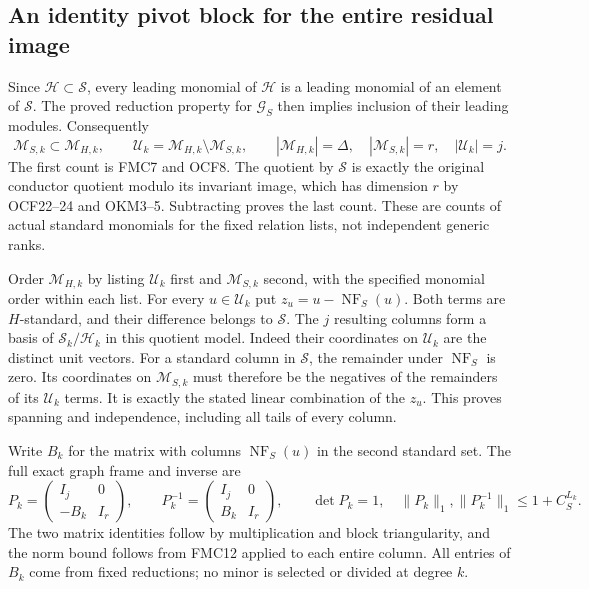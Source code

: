 \documentclass[11pt,a4paper]{article}
\begin{document}
\subsection{An identity pivot block for the entire residual image}

Since $\mathscr H\subset\mathscr S$, every leading monomial of
$\mathscr H$ is a leading monomial of an element of $\mathscr S$.
The proved reduction property for $\mathcal G_S$ then implies
inclusion of their leading modules. Consequently
\[
 \mathscr M_{S,k}\subset\mathscr M_{H,k},\qquad
 \mathscr U_k=\mathscr M_{H,k}\setminus\mathscr M_{S,k},\qquad
 |\mathscr M_{H,k}|=\Delta,\quad
 |\mathscr M_{S,k}|=r,\quad |\mathscr U_k|=j.
 \tag{FMC19}
\]
The first count is FMC7 and OCF8. The quotient by $\mathscr S$
is exactly the original conductor quotient modulo its invariant
image, which has dimension $r$ by OCF22--24 and OKM3--5.
Subtracting proves the last count. These are counts of actual
standard monomials for the fixed relation lists, not independent
generic ranks.

Order $\mathscr M_{H,k}$ by listing $\mathscr U_k$ first and
$\mathscr M_{S,k}$ second, with the specified monomial order within
each list. For every $u\in\mathscr U_k$ put
$z_u=u-\operatorname{NF}_S(u)$. Both terms are $H$-standard,
and their difference belongs to $\mathscr S$. The $j$ resulting
columns form a basis of $\mathscr S_k/\mathscr H_k$ in this
quotient model. Indeed their coordinates on $\mathscr U_k$ are
the distinct unit vectors. For a standard column in $\mathscr S$,
the remainder under $\operatorname{NF}_S$ is zero. Its coordinates
on $\mathscr M_{S,k}$ must therefore be the negatives of the
remainders of its $\mathscr U_k$ terms. It is exactly the stated
linear combination of the $z_u$. This proves spanning and
independence, including all tails of every column.

Write $B_k$ for the matrix with columns $\operatorname{NF}_S(u)$
in the second standard set. The full exact graph frame and inverse are
\[
 P_k=\begin{pmatrix}I_j&0\\-B_k&I_r\end{pmatrix},\qquad
 P_k^{-1}=\begin{pmatrix}I_j&0\\B_k&I_r\end{pmatrix},\qquad
 \det P_k=1,\quad
 \|P_k\|_1,\|P_k^{-1}\|_1\le1+C_S^{L_k}.
 \tag{FMC20}
\]
The two matrix identities follow by multiplication and block
triangularity, and the norm bound follows from FMC12 applied to
each entire column. All entries of $B_k$ come from fixed reductions;
no minor is selected or divided at degree $k$.
\end{document}
